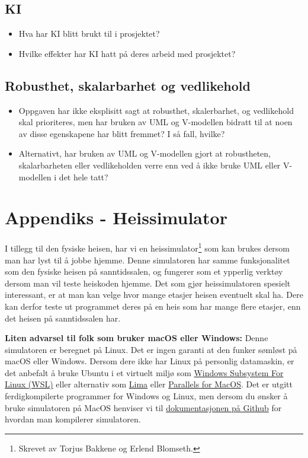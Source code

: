 \subsection{KI}
\begin{itemize}
    \item Hva har KI blitt brukt til i prosjektet?
    \item Hvilke effekter har KI hatt på deres arbeid med prosjektet?
\end{itemize}

\subsection{Robusthet, skalarbarhet og vedlikehold}


\begin{itemize}
    \item Oppgaven har ikke eksplisitt sagt at robusthet, skalerbarhet, og vedlikehold skal prioriteres, men har bruken av UML og V-modellen bidratt til at noen av disse egenskapene har blitt fremmet? I så fall, hvilke?
    \item Alternativt, har bruken av UML og V-modellen gjort at robustheten, skalarbarheten eller vedlikeholden verre enn ved å ikke bruke UML eller V-modellen i det hele tatt?
\end{itemize}

\section{Appendiks - Heissimulator   }\label{app:SImulator}

I tillegg til den fysiske heisen, har vi en heissimulator\footnote{Skrevet av Torjus Bakkene og Erlend Blomseth.} som kan brukes dersom man har lyst til å jobbe hjemme. Denne simulatoren har samme funksjonalitet som den fysiske heisen på sanntidssalen, og fungerer som et ypperlig verktøy dersom man vil teste heiskoden hjemme. Det som gjør heissimulatoren spesielt interessant, er at man kan velge hvor mange etasjer heisen eventuelt skal ha. Dere kan derfor teste ut programmet deres på en heis som har mange flere etasjer, enn det heisen på sanntidssalen har.

\textbf{Liten advarsel til folk som bruker macOS eller Windows:} Denne simulatoren er beregnet på Linux. Det er ingen garanti at den funker sømløst på macOS eller Windows. Dersom dere ikke har Linux på personlig datamaskin, er det anbefalt å bruke Ubuntu i et virtuelt miljø som \href{https://learn.microsoft.com/en-us/windows/wsl/install}{Windows Subsystem For Linux (WSL)} eller alternativ som \href{https://github.com/lima-vm/lima}{Lima} eller \href{https://www.parallels.com/products/desktop/trial/}{Parallels for MacOS}. Det er utgitt ferdigkompilerte programmer for Windows og Linux, men dersom du ønsker å bruke simulatoren på MacOS henviser vi til  \href{https://github.com/ITK-TTK4235/elevator_simulator#compiling-from-source}{dokumentasjonen på Github} for hvordan man kompilerer simulatoren. 



